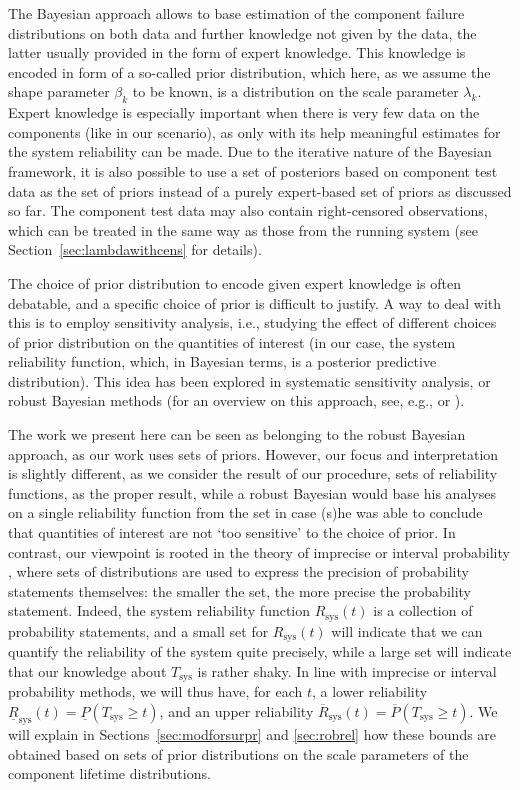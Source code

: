 \documentclass[Journal,SectionNumbers,SingleSpace,InsideFigs]{ascelike}
\newcommand{\ul}[1]{\underline{#1}}
\newcommand{\ol}[1]{\overline{#1}}
\newcommand{\Rsys}{R_\text{sys}}
\newcommand{\lRsys}{\ul{R}_\text{sys}}
\newcommand{\uRsys}{\ol{R}_\text{sys}}
\def\Rsys{R_\text{sys}}
\def\Tsys{T_\text{sys}}
\begin{document}
The Bayesian approach allows to base estimation of the component failure distributions
on both data and further knowledge not given by the data,
the latter usually provided in the form of expert knowledge.
This knowledge is encoded in form of a so-called prior distribution,
which here, as we assume the shape parameter $\beta_k$ to be known,
is a distribution on the scale parameter $\lambda_k$. %
Expert knowledge is especially important when there is very few data on the components (like in our scenario),
as only with its help meaningful estimates for the system reliability can be made.
%
Due to the iterative nature of the Bayesian framework,
it is also possible to use a set of posteriors based on component test data as the set of priors
instead of a purely expert-based set of priors as discussed so far.
The component test data may also contain right-censored observations,
which can be treated in the same way as those from the running system
(see Section~\ref{sec:lambdawithcens} for details).

The choice of prior distribution to encode given expert knowledge is often debatable,
and a specific choice of prior is difficult to justify.
A way to deal with this is to employ sensitivity analysis,
i.e., studying the effect of different choices of prior distribution on the quantities of interest
(in our case, the system reliability function, which, in Bayesian terms, is a posterior predictive distribution).
This idea has been explored in systematic sensitivity analysis, or robust Bayesian methods
(for an overview on this approach, see, e.g.,
 or ). %

The work we present here can be seen as belonging to the robust Bayesian approach,
as our work uses sets of priors. However, our focus and interpretation is slightly different,
as we consider the result of our procedure, sets of reliability functions, as the proper result,
while a robust Bayesian would base his analyses on a single reliability function from the set
in case (s)he was able to conclude that quantities of interest are not `too sensitive' to the choice of prior.
In contrast, our viewpoint is rooted in the theory of imprecise or interval probability \cite{1991:walley,itip},
where sets of distributions are used to express the precision of probability statements themselves:
the smaller the set, the more precise the probability statement.
Indeed, the system reliability function $\Rsys(t)$ is a collection of probability statements,
and a small set for $\Rsys(t)$ will indicate that we can quantify the reliability of the system quite precisely,
while a large set will indicate that our knowledge about $\Tsys$ is rather shaky.
%
In line with imprecise or interval probability methods, we will thus have, for each $t$,
a lower reliability $\lRsys(t) = \ul{P}(T_\text{sys} \geq t)$,
and an upper reliability $\uRsys(t) = \ol{P}(T_\text{sys} \geq t)$.
We will explain in Sections~\ref{sec:modforsurpr} and \ref{sec:robrel} how these bounds are obtained
based on sets of prior distributions on the scale parameters of the component lifetime distributions.
\end{document}
